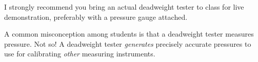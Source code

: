 I strongly recommend you bring an actual deadweight tester to class for live demonstration, preferably with a pressure gauge attached.  

\vskip 10pt

A common misconception among students is that a deadweight tester measures pressure.  Not so!  A deadweight tester {\it generates} precisely accurate pressures to use for calibrating {\it other} measuring instruments.





